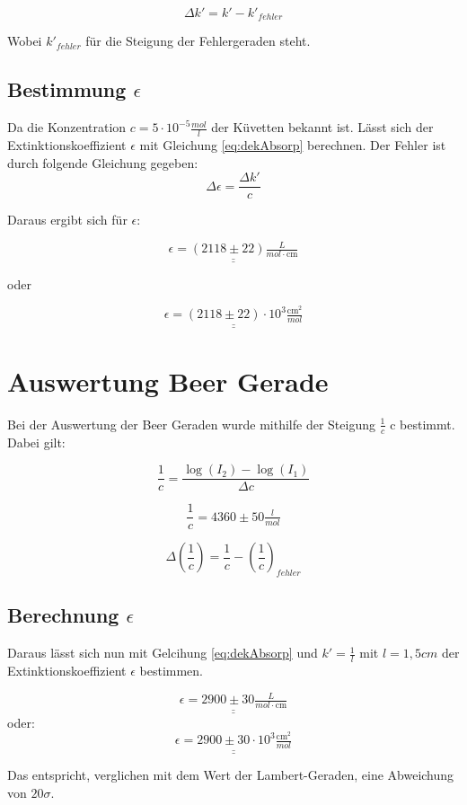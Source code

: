 \begin{equation}
    \Delta k' = k' - k'_{fehler}
\end{equation}

Wobei $k'_{fehler}$ für die Steigung der Fehlergeraden steht.

\subsection{Bestimmung $\epsilon$}

Da die Konzentration $c = 5 \cdot 10^{-5} \tfrac{mol}{l}$ der Küvetten bekannt ist.
Lässt sich der Extinktionskoeffizient $\epsilon$ mit Gleichung \ref{eq:dekAbsorp} berechnen. Der Fehler ist durch folgende Gleichung gegeben:
\begin{equation}
    \Delta \epsilon = \frac{\Delta k'}{c}
\end{equation}

Daraus ergibt sich für $\epsilon$:

\[ \underline{\underline{\epsilon = (2118 \pm 22) \tfrac{L}{mol \cdot \text{cm}}}}\]

oder


\[ \underline{\underline{\epsilon =( 2118 \pm 22) \cdot 10^3\tfrac{\text{cm}^2}{mol}}}\]

\section{Auswertung Beer Gerade}

Bei der Auswertung der Beer Geraden wurde mithilfe der Steigung $\frac{1}{c}$ c
bestimmt. Dabei gilt:

\begin{equation}
    \frac{1}{c} = \frac{\log(I_2)-\log(I_1)}{\Delta c}
\end{equation}

\[ \frac{1}{c} = 4360 \pm 50 \tfrac{l}{mol}\]

\begin{equation}
    \Delta(\frac{1}{c}) = \frac{1}{c} - (\frac{1}{c})_{fehler}
\end{equation}

\subsection{Berechnung $\epsilon$}

Daraus lässt sich nun mit Gelcihung \ref{eq:dekAbsorp} und $k' = \frac{1}{l}$ mit $l = 1,5 cm$
der Extinktionskoeffizient $\epsilon$ bestimmen.

\[ \underline{\underline{\epsilon = 2900 \pm 30 \tfrac{L}{mol \cdot \text{cm}}}}\]
oder:
\[ \underline{\underline{\epsilon = 2900 \pm 30 \cdot 10^3\tfrac{\text{cm}^2}{mol}}}\]

Das entspricht, verglichen mit dem Wert der Lambert-Geraden, eine Abweichung von $20 \sigma$.

